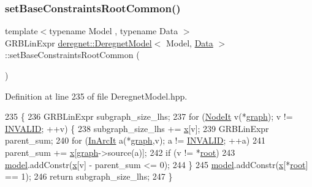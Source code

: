 \subsubsection{\texorpdfstring{set\+Base\+Constraints\+Root\+Common()}{setBaseConstraintsRootCommon()}}
{\footnotesize\ttfamily template$<$typename Model , typename Data $>$ \\
G\+R\+B\+Lin\+Expr \hyperlink{classderegnet_1_1DeregnetModel}{deregnet\+::\+Deregnet\+Model}$<$ Model, \hyperlink{avgdrgnt_8cpp_a1d1235306db276e9b36acba1db1509e8}{Data} $>$\+::set\+Base\+Constraints\+Root\+Common (\begin{DoxyParamCaption}{ }\end{DoxyParamCaption})\hspace{0.3cm}{\ttfamily [private]}}



Definition at line 235 of file Deregnet\+Model.\+hpp.


\begin{DoxyCode}
235                                                                     \{
236     GRBLinExpr subgraph\_size\_lhs;
237     \textcolor{keywordflow}{for} (\hyperlink{namespacederegnet_ac34314e1b5f456fc6d1bb9d96316de4a}{NodeIt} v(*\hyperlink{classderegnet_1_1DeregnetModel_a3cd2f54b8e061ef5bed32708d9bc1ef1}{graph}); v != \hyperlink{usinglemon_8hpp_adf770fe2eec438e3758ffe905dbae208}{INVALID}; ++v) \{
238         subgraph\_size\_lhs += \hyperlink{classderegnet_1_1DeregnetModel_a360c980f3fec4dfbab50e9bb06a933a8}{x}[v];
239         GRBLinExpr parent\_sum;
240         \textcolor{keywordflow}{for} (\hyperlink{namespacederegnet_aed58be361aeda4ef7a9eaca2731ba830}{InArcIt} a(*\hyperlink{classderegnet_1_1DeregnetModel_a3cd2f54b8e061ef5bed32708d9bc1ef1}{graph},v); a != \hyperlink{usinglemon_8hpp_adf770fe2eec438e3758ffe905dbae208}{INVALID}; ++a)
241             parent\_sum += \hyperlink{classderegnet_1_1DeregnetModel_a360c980f3fec4dfbab50e9bb06a933a8}{x}[\hyperlink{classderegnet_1_1DeregnetModel_a3cd2f54b8e061ef5bed32708d9bc1ef1}{graph}->source(a)];
242         \textcolor{keywordflow}{if} (v != *\hyperlink{classderegnet_1_1DeregnetModel_a54b20393a0e26d65935d387685d7fe96}{root})
243             \hyperlink{classderegnet_1_1DeregnetModel_a30d525de2086e342b33fe3e45ede4947}{model}.addConstr(\hyperlink{classderegnet_1_1DeregnetModel_a360c980f3fec4dfbab50e9bb06a933a8}{x}[v] - parent\_sum <= 0);
244     \}
245     \hyperlink{classderegnet_1_1DeregnetModel_a30d525de2086e342b33fe3e45ede4947}{model}.addConstr(\hyperlink{classderegnet_1_1DeregnetModel_a360c980f3fec4dfbab50e9bb06a933a8}{x}[*\hyperlink{classderegnet_1_1DeregnetModel_a54b20393a0e26d65935d387685d7fe96}{root}] == 1);
246     \textcolor{keywordflow}{return} subgraph\_size\_lhs;
247 \}
\end{DoxyCode}
\mbox{\label{classderegnet_1_1DeregnetModel_a6cecefeafaf782843c91e0c55e768a94}} 
